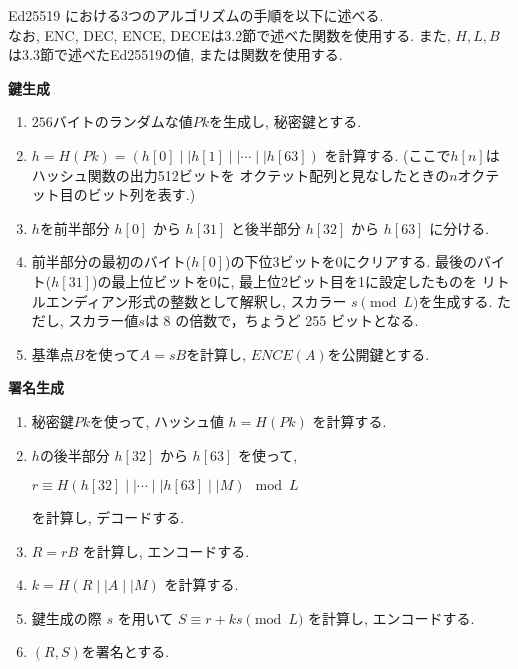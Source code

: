 Ed25519 における3つのアルゴリズムの手順を以下に述べる.\\
\indent なお, ENC, DEC, ENCE, DECEは3.2節で述べた関数を使用する.
また, $H, L, B$は3.3節で述べたEd25519の値, または関数を使用する.\\[1em]
\let\ltxlist\list
\begin{breakitembox}[l]{\textbf{鍵生成}}
  　
  \begin{enumerate}[parsep=7pt]
    \item $256$バイトのランダムな値$Pk$を生成し, 秘密鍵とする.
    \item $h=H(Pk)=(h[0]\mid\mid h[1]\mid\mid \cdots\mid\mid h[63])$
    を計算する. (ここで$h[n]$はハッシュ関数の出力512ビットを
    オクテット配列と見なしたときの$n$オクテット目のビット列を表す.)
    \item $h$を前半部分 $h[0]$ から $h[31]$ と後半部分 $h[32]$ から $h[63]$ に分ける.
    \item 前半部分の最初のバイト($h[0]$)の下位3ビットを0にクリアする.
    最後のバイト($h[31]$)の最上位ビットを0に, 最上位2ビット目を1に設定したものを
    リトルエンディアン形式の整数として解釈し, スカラー $s \pmod L$を生成する. 
    ただし, スカラー値$s$は 8 の倍数で，ちょうど 255 ビットとなる.
    \item 基準点$B$を使って$A = sB$を計算し, $ENCE(A)$を公開鍵とする. 
  \end{enumerate}
\end{breakitembox}
\vspace{2em}
\let\ltxlist\list
\begin{breakitembox}[l]{\textbf{署名生成}}
  　
  \begin{enumerate}[parsep=7pt]
    \item 秘密鍵$Pk$を使って, ハッシュ値 $h=H(Pk)$ を計算する.
    \item $h$の後半部分 $h[32]$ から $h[63]$ を使って, 
    \begin{center}
      $r \equiv H(h[32]\mid\mid \cdots \mid\mid h[63] \mid\mid M) \mod L$
    \end{center}
    を計算し, デコードする.
    \item $R=rB$ を計算し, エンコードする.
    \item $k=H(R \mid\mid A \mid\mid M)$ を計算する.
    \item 鍵生成の際 $s$ を用いて $S\equiv r+ks \pmod L$ を計算し, エンコードする.
    \item $(R,S)$を署名とする.
  \end{enumerate}
\end{breakitembox}

